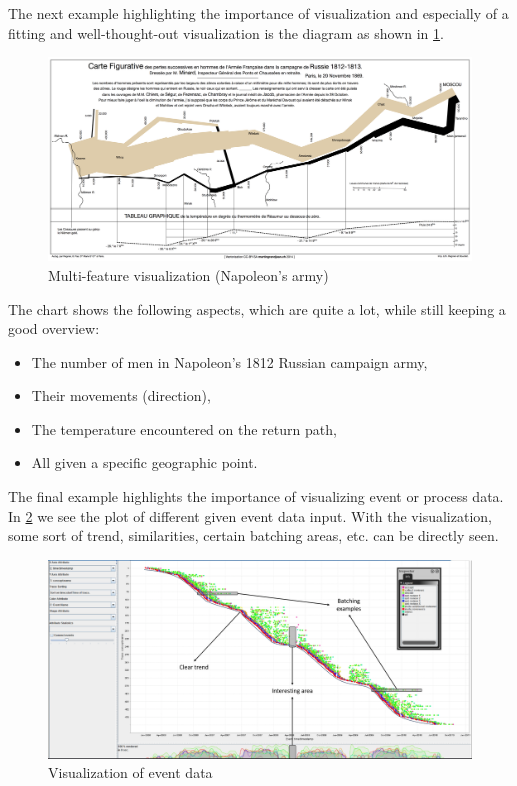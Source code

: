 The next example highlighting the importance of visualization and especially of a fitting and well-thought-out visualization is the diagram as shown in \ref{fig:2_napoleon}. 

\begin{figure}[H]
  \centering
  \includegraphics[width=\textwidth]{assets/visualization_and_extraction/napolean.png}
  \caption{Multi-feature visualization (Napoleon's army)}
  \label{fig:2_napoleon}
\end{figure}

The chart shows the following aspects, which are quite a lot, while still keeping a good overview:
\begin{itemize}
  \item The number of men in Napoleon's 1812 Russian campaign army,
  \item Their movements (direction),
  \item The temperature encountered on the return path,
  \item All given a specific geographic point.
\end{itemize}

The final example highlights the importance of visualizing event or process data. In \ref{fig:2_event_data} we see the plot of different given event data input. With the visualization, some sort of trend, similarities, certain batching areas, etc. can be directly seen.

\begin{figure}[H]
  \centering
  \includegraphics[width=\textwidth]{assets/visualization_and_extraction/event_data_visualization.png}
  \caption{Visualization of event data}
  \label{fig:2_event_data}
\end{figure}

